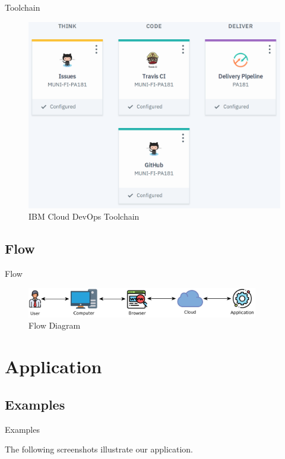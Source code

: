 \documentclass[]{beamer}
\begin{document}
    \begin{frame}{Toolchain}
      \begin{figure}[H]
        \includegraphics[width=.75\textwidth,height=.75\textheight,keepaspectratio]{img/toolchain.png}
        \caption{IBM Cloud DevOps Toolchain}
      \end{figure}
    \end{frame}

  \subsection{Flow}

    \begin{frame}{Flow}
      \begin{figure}[H]
        \includegraphics[width=0.9\textwidth,height=0.9\textheight,keepaspectratio]{diag/flow.pdf}
        \caption{Flow Diagram}
      \end{figure}
    \end{frame}

\section[Application]{Application}

  \subsection{Examples}

    \begin{frame}{Examples}
      \vspace{7.5mm}
      \centerline{The following screenshots illustrate our application.}
    \end{frame}
\end{document}

